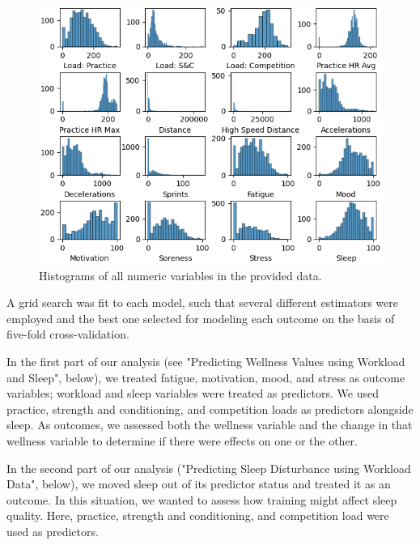 \documentclass{article}
\begin{document}
			\begin{figure}
			\end{figure}

			\begin{figure}
				\begin{center}
					\includegraphics{../images/eda/eda_hist_all}
				\end{center}
				\caption{Histograms of all numeric variables in the provided data.}
				\label{fig:eda_hist_all}
			\end{figure}

			A grid search was fit to each model, such that several different
			estimators were employed and the best one selected for modeling
			each outcome on the basis of five-fold cross-validation.

			In the first part of our analysis (see
			"Predicting Wellness Values using Workload and Sleep", below),
			we treated fatigue, motivation,
			mood, and stress as outcome variables; workload and sleep variables
			were treated as predictors. We used practice, strength and conditioning,
			and competition loads as predictors alongside sleep. As outcomes, we
			assessed both the wellness variable and the change in that wellness
			variable to determine if there were effects on one or the other.

			In the second part of our analysis ("Predicting Sleep Disturbance using
			Workload Data", below), we moved sleep out of its predictor status and
			treated it as an outcome. In this situation, we wanted to assess how
			training might affect sleep quality. Here, practice, strength and
			conditioning, and competition load were used as predictors.
\end{document}
